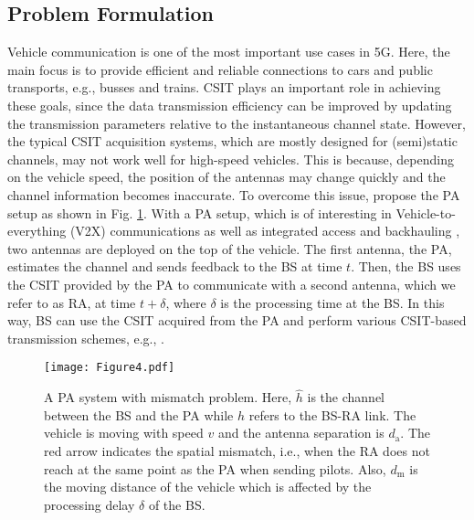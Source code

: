 \subsection{Problem Formulation}
Vehicle communication is one of the most important use cases in 5G.  Here, the main focus is to provide efficient and reliable connections to cars and public transports, e.g., busses and trains. CSIT plays an important role in achieving these goals, since the data transmission efficiency can be improved by updating the transmission parameters relative to the instantaneous channel state.  However, the typical CSIT acquisition systems, which are mostly designed for (semi)static channels, may not work well for high-speed vehicles. This is because, depending on the vehicle speed, the position of the antennas may change quickly and the channel information becomes inaccurate.  To overcome this issue, \cite{Sternad2012WCNCWusing,DT2015ITSMmaking,BJ2017PIMRCpredictor,phan2018WSAadaptive,Jamaly2014EuCAPanalysis, BJ2017ICCWusing} propose the PA setup as shown in Fig. \ref{system}. With a PA setup, which is of interesting in Vehicle-to-everything (V2X) communications \cite{Sternad2012WCNCWusing} as well as integrated access and backhauling \cite{Teyeb2019VTCintegrated}, two antennas are deployed on the top of the vehicle. The first antenna,  the PA,  estimates the channel and sends feedback to the BS at time $t$. Then, the BS uses the CSIT provided by the PA to communicate with a second antenna, which we refer to as RA, at time $t+\delta$, where $\delta$ is the processing time at the BS. In this way, BS can use the CSIT acquired from the PA and perform various CSIT-based transmission schemes, e.g.,  \cite{Sternad2012WCNCWusing,BJ2017ICCWusing}.  


\begin{figure}
\centering
  \texttt{[image: Figure4.pdf]}\\
\caption{A PA system with  mismatch problem. Here, $\hat h$ is the channel between the BS and the PA while $h$ refers to the BS-RA link. The vehicle is moving with speed $v$ and the antenna separation is $d_\text{a}$. The red arrow indicates the spatial mismatch, i.e., when the RA does not reach at the same  point as the PA when sending pilots. Also, $d_\text{m}$ is the moving distance of the vehicle which is affected by the processing delay $\delta$ of the BS. }\label{system}
\end{figure}


